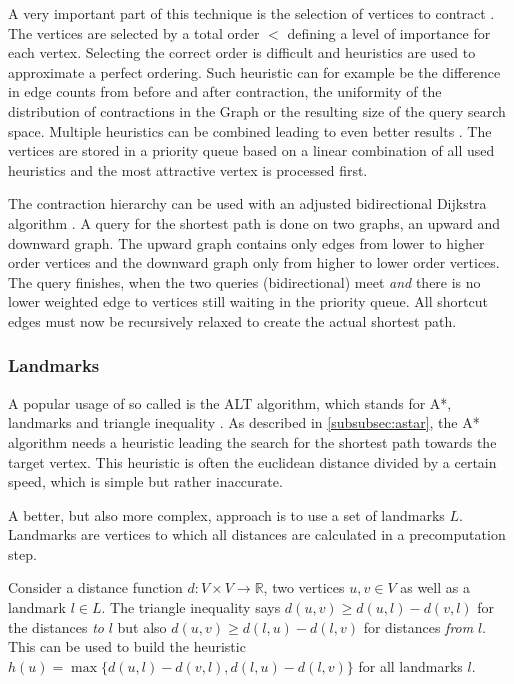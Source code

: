 			A very important part of this technique is the selection of vertices to contract \cite[14]{geisberger-contraction-hierarchies}.
			The vertices are selected by a total order $<$ defining a level of importance for each vertex.
			Selecting the correct order is difficult and heuristics are used to approximate a perfect ordering.
			Such heuristic can for example be the difference in edge counts from before and after contraction, the uniformity of the distribution of contractions in the Graph or the resulting size of the query search space.
			Multiple heuristics can be combined leading to even better results \cite[49]{geisberger-contraction-hierarchies}.
			The vertices are stored in a priority queue based on a linear combination of all used heuristics and the most attractive vertex is processed first.
			
			The contraction hierarchy can be used with an adjusted bidirectional Dijkstra algorithm \cite[29-30]{geisberger-contraction-hierarchies}.
			A query for the shortest path is done on two graphs, an upward and downward graph.
			The upward graph contains only edges from lower to higher order vertices and the downward graph only from higher to lower order vertices.
			The query finishes, when the two queries (bidirectional) meet \emph{and} there is no lower weighted edge to vertices still waiting in the priority queue.
			All shortcut edges must now be recursively relaxed to create the actual shortest path.
		
		\subsubsection{Landmarks}
		
			A popular usage of so called  is the ALT algorithm, which stands for A*, landmarks and triangle inequality \cite{goldberg-landmarks}.
			As described in \cref{subsubsec:astar}, the A* algorithm needs a heuristic leading the search for the shortest path towards the target vertex.
			This heuristic is often the euclidean distance divided by a certain speed, which is simple but rather inaccurate.
			
			A better, but also more complex, approach is to use a set of landmarks $L$.
			Landmarks are vertices to which all distances are calculated in a precomputation step.
			
			Consider a distance function $d : V \times V \rightarrow \mathbb{R}$, two vertices $u, v \in V$ as well as a landmark $l \in L$.
			The triangle inequality says $d(u,v) \geq d(u,l) - d(v,l)$ for the distances \emph{to} $l$ but also $d(u,v) \geq d(l,u) - d(l,v)$ for distances \emph{from} $l$.
			This can be used to build the heuristic $h(u) = \max \{ d(u,l)-d(v,l), d(l,u)-d(l,v) \}$ for all landmarks $l$.
			
